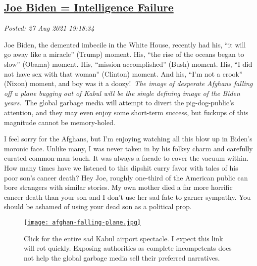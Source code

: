 %

\subsection*{\href{http://analyzethedatanotthedrivel.org/2021/08/27/joe-biden-intelligence-failure/}{Joe Biden = Intelligence Failure}}


\noindent\emph{Posted: 27 Aug 2021 19:18:34}
\vspace{6pt}

Joe Biden, the demented imbecile in the White House, recently had his,
``it will go away like a miracle'' (Trump) moment. His, ``the rise of
the oceans began to slow'' (Obama) moment. His, ``mission accomplished''
(Bush) moment. His, ``I did not have sex with that woman'' (Clinton)
moment. And his, ``I'm not a crook'' (Nixon) moment, and boy was it a
doozy!~\emph{The image of desperate Afghans falling off a plane bugging
out of Kabul will be the single defining image of the Biden years.}~The
global garbage media will attempt to divert the pig-dog-public's
attention, and they may even enjoy some short-term success, but fuckups
of this magnitude cannot be memory-holed.


I feel sorry for the Afghans, but I'm enjoying watching all this blow up
in Biden's moronic face. Unlike many, I was never taken in by his folksy
charm and carefully curated common-man touch. It was always a facade to
cover the vacuum within. How many times have we listened to this dipshit
curry favor with tales of his poor son's cancer death? Hey Joe, roughly
one-third of the American public can bore strangers with similar
stories. My own mother died a far more horrific cancer death than your
son and I don't use her sad fate to garner sympathy. You should be
ashamed of using your dead son as a political prop.

\captionsetup[figure]{labelformat=empty}
\begin{SCfigure}[50]
\centering
\href{https://www.huffpost.com/entry/kabul-airport-video-afghans-clinging-plane_n_611a6142e4b07b9118ad564d}{\texttt{[image: afghan-falling-plane.jpg]}}
\caption[Click for the Kabul airport spectacle]{Click for the entire sad Kabul airport spectacle. I expect this
link will rot quickly. Exposing authorities as complete incompetents
does not help the global garbage media sell their preferred narratives.}
\label{fig:7221x0}
\end{SCfigure}

